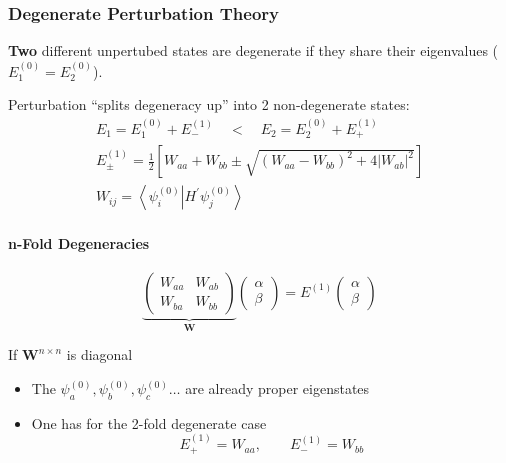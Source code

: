 \subsubsection{Degenerate Perturbation Theory}
\textbf{Two} different unpertubed states are degenerate if they share their eigenvalues ($E_1^{(0)} = E_2^{(0)}$).

\newpar{}
Perturbation ``splits degeneracy up'' into 2 non-degenerate states:
\noindent\begin{gather*}
    E_1 = E_1^{(0)} + E_{-}^{(1)} \quad < \quad E_2 = E_2^{(0)} + E_{+}^{(1)}\\
    E_{\pm}^{(1)}=\frac{1}{2}\left[W_{aa}+W_{bb}\pm\sqrt{{(W_{aa}-W_{bb})}^{2}+4 |W_{ab}|^{2}}\right]\\
    W_{ij}=\left\langle\psi_{i}^{(0)} \right| H^{\prime} \left.\psi_{j}^{(0)}\right\rangle
\end{gather*}

\paragraph{n-Fold Degeneracies}
\noindent\begin{equation*}
    \underbrace{
        \left(\begin{array}{cc}
            W_{aa} & W_{ab} \\
            W_{ba} & W_{bb}
        \end{array}\right)}_{\mathbf{W}}
    \left(\begin{array}{c}
            \alpha \\
            \beta
        \end{array}\right)
    =E^{(1)}\left(\begin{array}{c}
            \alpha \\
            \beta
        \end{array}\right)
\end{equation*}

If $\mathbf{W}^{n\times n}$ is diagonal
\begin{itemize}
    \item The $\psi_a^{(0)},\psi_b^{(0)},\psi_c^{(0)} \dots $ are already proper eigenstates
    \item One has for the 2-fold degenerate case
          \noindent\begin{equation*}
              E_{+}^{(1)}  =W_{aa}, \qquad E_{-}^{(1)}  =W_{bb}
          \end{equation*}
\end{itemize}

